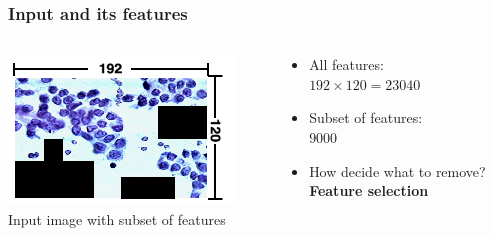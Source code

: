 \documentclass[aspectratio=1610]{beamer}
\begin{document}
\begin{frame}
  \frametitle{\hfill Input and its features}
  \begin{columns}[T]
    \begin{column}{.5\textwidth}
      \begin{block}{}
        \includegraphics[width=\textwidth]{images/FsPicHalvPNG.png}\\
        Input image with subset of features
      \end{block}
    \end{column}
    \begin{column}{.5\textwidth}
      \begin{block}{}
        \begin{itemize}
          \item All features:\\
            $192\times120=23040$
          \item Subset of features:\\
            $9000$\pause
          \item How decide what to remove?\\
          \textbf{Feature selection}
        \end{itemize}
        \vspace{0.02\textheight}
      \end{block}
    \end{column}
  \end{columns}
\end{frame}
\end{document}
